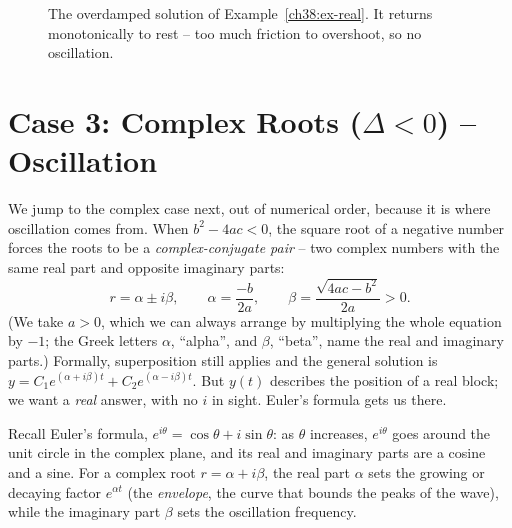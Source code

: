 \begin{figure}[htbp]
\centering
{}
\caption{The overdamped solution of Example~\ref{ch38:ex-real}. It returns
monotonically to rest -- too much friction to overshoot, so no oscillation.}
\label{ch38:fig-overdamped}
\end{figure}

\section{Case 3: Complex Roots \texorpdfstring{($\Delta < 0$)}{(Delta < 0)} -- Oscillation}
\label{ch38:complex-roots}

We jump to the complex case next, out of numerical order, because it is
where oscillation comes from. When $b^2 - 4ac < 0$, the square
root of a negative number forces the roots to be a \emph{complex-conjugate pair}
-- two complex numbers with the same real part and opposite imaginary parts:
\[
  r = \alpha \pm i\beta,
  \qquad
  \alpha = \frac{-b}{2a}, \qquad
  \beta = \frac{\sqrt{4ac - b^2}}{2a} > 0.
\]
(We take $a > 0$, which we can always arrange by multiplying the whole equation
by $-1$; the Greek letters $\alpha$, ``alpha'', and $\beta$, ``beta'', name the
real and imaginary parts.)
Formally, superposition still applies and the general solution is
$y = C_1 e^{(\alpha + i\beta)t} + C_2 e^{(\alpha - i\beta)t}$. But $y(t)$
describes the position of a real block; we want a \emph{real} answer, with no $i$
in sight. Euler's formula gets us there.

\begin{happeningbox}
Recall Euler's formula, $e^{i\theta} = \cos\theta + i\sin\theta$: as $\theta$
increases, $e^{i\theta}$ goes around the unit circle in the complex plane, and its
real and imaginary parts are a cosine and a sine. For a complex root $r = \alpha + i\beta$, the real
part $\alpha$ sets the growing or decaying factor $e^{\alpha t}$ (the
\emph{envelope}, the curve that bounds the peaks of the wave),
while the imaginary part $\beta$ sets the oscillation frequency.
\end{happeningbox}

